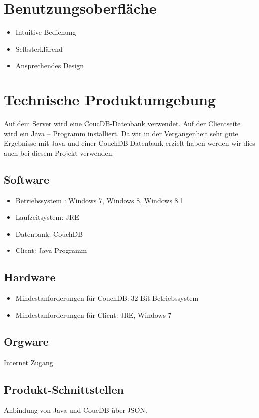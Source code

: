 \documentclass[a4paper,listof=leveldown,listof=numbered]{scrreprt}
\begin{document}
\chapter{Benutzungsoberfläche}
	\begin{itemize}
		\item Intuitive Bedienung
		\item Selbsterklärend
		\item Ansprechendes Design
	\end{itemize}
	
\chapter{Technische Produktumgebung}
	Auf dem Server wird eine CoucDB-Datenbank verwendet. Auf der Clientseite wird ein Java – Programm installiert. Da wir in der Vergangenheit sehr gute Ergebnisse mit Java und einer CouchDB-Datenbank erzielt haben werden wir dies auch bei diesem Projekt verwenden.
	
	\section{Software}
	\begin{itemize}
		\item Betriebssystem : Windows 7, Windows 8, Windows 8.1
		\item Laufzeitsystem: JRE
		\item Datenbank: CouchDB
		\item Client: Java Programm
	\end{itemize}

	\section{Hardware}
	\begin{itemize}
		\item Mindestanforderungen für CouchDB: 32-Bit Betriebssystem
		\item Mindestanforderungen für Client: JRE, Windows 7
	\end{itemize}

	\section{Orgware}
	Internet Zugang
	
	\section{Produkt-Schnittstellen}
	Anbindung von Java und CoucDB über JSON.
	
\end{document}
